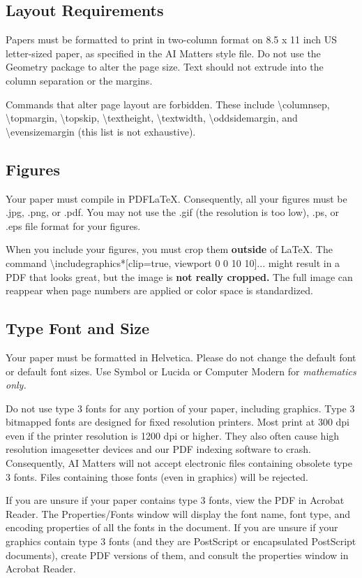 \documentclass[letterpaper]{article}
\begin{document}
\subsection{Layout Requirements}
Papers must be formatted to print in two-column format on 8.5 x 11 inch US letter-sized paper, as specified in the AI Matters style file.  Do not use the Geometry package to alter the page size.  Text should not extrude into the column separation or the margins.

Commands that alter page layout are forbidden. These include \textbackslash columnsep, \textbackslash topmargin, \textbackslash topskip, \textbackslash textheight, \textbackslash textwidth, \textbackslash oddsidemargin, and \textbackslash evensizemargin (this list is not exhaustive).


\subsection{Figures}
Your paper must compile in PDF\LaTeX{}. Consequently, all your figures must be .jpg, .png, or .pdf. You may not use the .gif (the resolution is too low), .ps, or .eps file format for your figures.

When you include your figures, you must crop them \textbf{outside} of \LaTeX{}. The command \textbackslash includegraphics*[clip=true, viewport 0 0 10 10]{...} might result in a PDF that looks great, but the image is \textbf{not really cropped.} The full image can reappear when page numbers are applied or color space is standardized. 

\subsection{Type Font and Size}
Your paper must be formatted in Helvetica.  Please do not change the default font or default font sizes.  Use Symbol or Lucida or Computer Modern for \textit{mathematics only. } 

Do not use type 3 fonts for any portion of your paper, including graphics. Type 3 bitmapped fonts are designed for fixed resolution printers. Most print at 300 dpi even if the printer resolution is 1200 dpi or higher. They also often cause high resolution imagesetter devices and our PDF indexing software to crash. Consequently, AI Matters will not accept electronic files containing obsolete type 3 fonts. Files containing those fonts (even in graphics) will be rejected. 

If you are unsure if your paper contains type 3 fonts, view the PDF in Acrobat Reader. The Properties/Fonts window will display the font name, font type, and encoding properties of all the fonts in the document. If you are unsure if your graphics contain type 3 fonts (and they are PostScript or encapsulated PostScript documents), create PDF versions of them, and consult the properties window in Acrobat Reader. 
\end{document}
